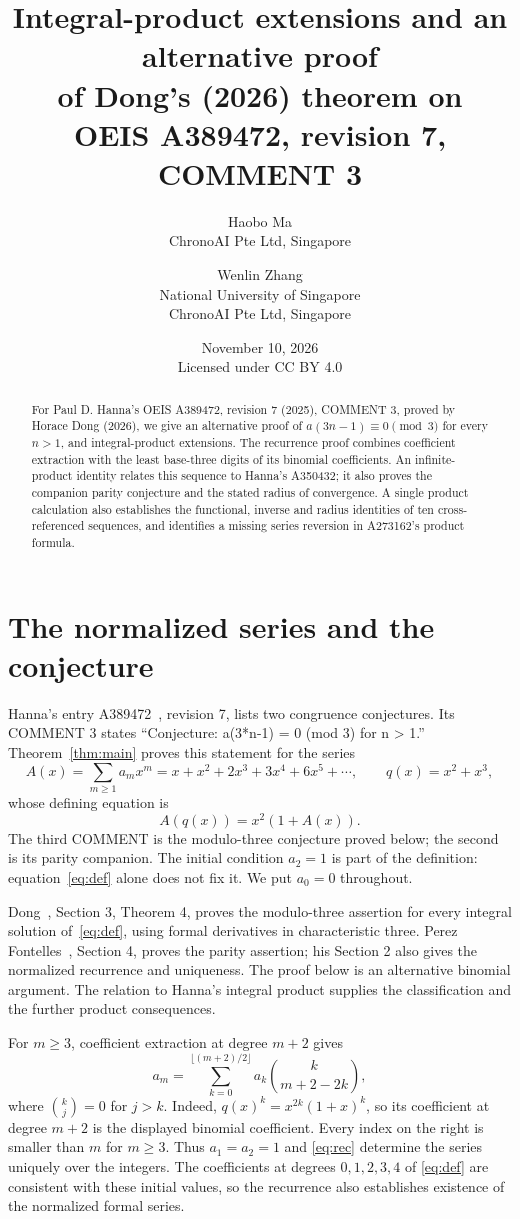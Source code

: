 \documentclass[11pt]{article}
\title{Integral-product extensions and an alternative proof\protect\\
of Dong's (2026) theorem on\protect\\
OEIS A389472, revision 7, COMMENT 3}
\author{Haobo Ma\protect\\\small ChronoAI Pte Ltd, Singapore
\and Wenlin Zhang\protect\\\small National University of Singapore\protect\\\small ChronoAI Pte Ltd, Singapore}
\date{November 10, 2026\protect\\\small Licensed under CC BY 4.0}
\begin{document}
\maketitle
\begin{abstract}
For Paul D. Hanna's OEIS A389472, revision 7 (2025), COMMENT 3,
proved by Horace Dong (2026), we give an alternative proof of
$a(3n-1)\equiv0\pmod3$ for every $n>1$, and integral-product extensions.
The recurrence proof combines coefficient extraction with the
least base-three digits of its binomial coefficients.
An infinite-product identity relates this sequence to Hanna's A350432;
it also proves the companion parity conjecture and the stated radius of
convergence. A single product calculation also establishes the functional,
inverse and radius identities of ten cross-referenced sequences, and identifies
a missing series reversion in A273162's product formula.
\end{abstract}

\section{The normalized series and the conjecture}
Hanna's entry A389472~\cite{hanna472}, revision 7, lists two congruence
conjectures. Its COMMENT 3 states
``Conjecture: a(3*n-1) = 0 (mod 3) for n > 1.''
Theorem~\ref{thm:main} proves this statement for the series
\[
 A(x)=\sum_{m\ge1}a_mx^m
     =x+x^2+2x^3+3x^4+6x^5+\cdots,
 \qquad q(x)=x^2+x^3,
\]
whose defining equation is
\begin{equation}\label{eq:def}
 A(q(x))=x^2(1+A(x)).
\end{equation}
The third COMMENT is the modulo-three conjecture proved below;
the second is its parity companion. The initial condition $a_2=1$
is part of the definition: equation~\eqref{eq:def} alone does not fix it.
We put $a_0=0$ throughout.

Dong~\cite{dong}, Section 3, Theorem 4, proves the modulo-three assertion
for every integral solution of~\eqref{eq:def}, using formal derivatives
in characteristic three. Perez Fontelles~\cite{perez}, Section 4,
proves the parity assertion; his Section 2 also gives the normalized
recurrence and uniqueness. The proof below is an alternative
binomial argument. The relation to Hanna's integral product supplies
the classification and the further product consequences.

For $m\ge3$, coefficient extraction at degree $m+2$ gives
\begin{equation}\label{eq:rec}
 a_m=\sum_{k=0}^{\lfloor(m+2)/2\rfloor}
       a_k\binom{k}{m+2-2k},
\end{equation}
where $\binom{k}{j}=0$ for $j>k$. Indeed,
$q(x)^k=x^{2k}(1+x)^k$, so its coefficient at degree $m+2$
is the displayed binomial coefficient. Every index on the right is
smaller than $m$ for $m\ge3$. Thus $a_1=a_2=1$ and
\eqref{eq:rec} determine the series uniquely over the integers.
The coefficients at degrees $0,1,2,3,4$ of \eqref{eq:def}
are consistent with these initial values, so the recurrence also establishes
existence of the normalized formal series.
\end{document}
